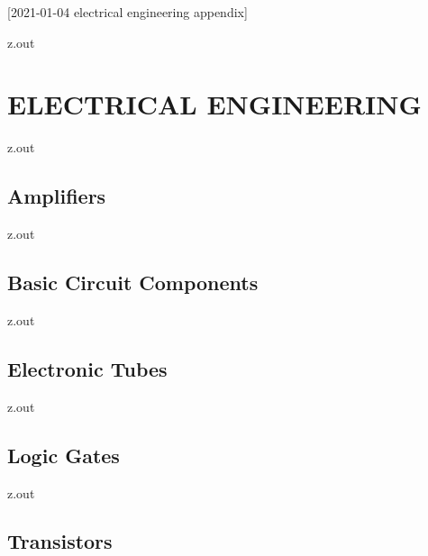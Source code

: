 [2021-01-04 electrical engineering appendix]

\begin{VerbatimOut}{z.out}
\chapter{ELECTRICAL ENGINEERING}
\end{VerbatimOut}

\MyIO


\begin{VerbatimOut}{z.out}

\section{Amplifiers}
\end{VerbatimOut}

\MyIO


\begin{VerbatimOut}{z.out}

\section{Basic Circuit Components}
\end{VerbatimOut}

\MyIO


\begin{VerbatimOut}{z.out}

\section{Electronic Tubes}
\end{VerbatimOut}

\MyIO


\begin{VerbatimOut}{z.out}

\section{Logic Gates}
\end{VerbatimOut}

\MyIO


\begin{VerbatimOut}{z.out}

\section{Transistors}
\end{VerbatimOut}

\MyIO
